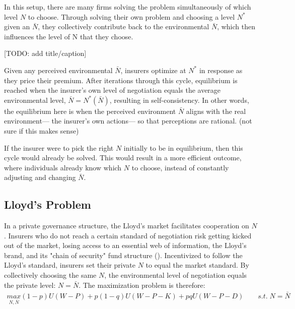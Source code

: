 \documentclass[12pt]{article}
\begin{document}
In this setup, there are many firms solving the problem simultaneously of which level $N$ to choose. Through solving their own problem and choosing a level $N^*$ given an $\bar{N}$, they collectively contribute back to the environmental $\bar{N}$, which then influences the level of N that they choose.

\begin{center}
\end{center}

[TODO: add title/caption]

Given any perceived environmental $\bar{N}$, insurers optimize at $N^*$ in response as they price their premium. After iterations through this cycle, equilibrium is reached when the insurer's own level of negotiation equals the average environmental level, $\bar{N} = N^*(\bar{N})$, resulting in self-consistency. In other words, the equilibrium here is when the perceived environment $\bar{N}$ aligns with the real environment--- the insurer's own actions--- so that perceptions are rational. (not sure if this makes sense)

If the insurer were to pick the right $N$ initially to be in equilibrium, then this cycle would already be solved. This would result in a more efficient outcome, where individuals already know which $N$ to choose, instead of constantly adjusting and changing $\bar{N}$. 


\subsection{Lloyd's Problem}

In a private governance structure, the Lloyd's market facilitates cooperation on $N$. Insurers who do not reach a certain standard of negotiation risk getting kicked out of the market, losing access to an essential web of information, the Lloyd's brand, and its "chain of security" fund structure (). Incentivized to follow the Lloyd's standard, insurers set their private $N$ to equal the market standard. By collectively choosing the same $N$, the environmental level of negotiation equals the private level: $N = \bar{N}$. The maximization problem is therefore:
\begin{align*}
\underset{N, \bar{N}}{max} (1-p)U(W-P) + p(1-q)U(W-P-K) + pqU(W-P-D) \qquad s.t. \; N = \bar{N}
\end{align*}
\end{document}
